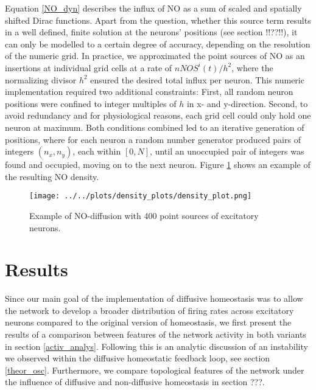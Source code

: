 \documentclass[10pt,a4paper]{article}
\begin{document}
Equation \eqref{NO_dyn} describes the influx of NO as a sum of scaled and spatially shifted Dirac functions. Apart from the question, whether this source term results in a well defined, finite solution at the neurons' positions (see section !!??!!), it can only be modelled to a certain degree of accuracy, depending on the resolution of the numeric grid. In practice, we approximated the point sources of NO as an insertions at individual grid cells at a rate of $nNOS^i(t) / h^2$, where the normalizing divisor $h^2$ ensured the desired total influx per neuron. This numeric implementation required two additional constraints: First, all random neuron positions were confined to integer multiples of $h$ in x- and y-direction. Second, to avoid redundancy and for physiological reasons, each grid cell could only hold one neuron at maximum. Both conditions combined led to an iterative generation of positions, where for each neuron a random number generator produced pairs of integers $(n_x,n_y)$, each within $[0,N]$, until an unoccupied pair of integers was found and occupied, moving on to the next neuron. Figure \ref{diff_test_plot} shows an example of the resulting NO density. 
\begin{figure}[h!]
\begin{center}
\texttt{[image: ../../plots/density\_plots/density\_plot.png]}
\end{center}
\caption{Example of NO-diffusion with 400 point sources of excitatory neurons.}
\label{diff_test_plot}
\end{figure}


\section{Results} \label{results}

Since our main goal of the implementation of diffusive homeostasis was to allow the network to develop a broader distribution of firing rates across excitatory neurons compared to the original version of homeostasis, we first present the results of a comparison between features of the network activity in both variants in section \ref{activ_analys}. Following this is an analytic discussion of an instability we observed within the diffusive homeostatic feedback loop, see section \ref{theor_osc}. Furthermore, we compare topological features of the network under the influence of diffusive and non-diffusive homeostasis in section ???. 
\end{document}

